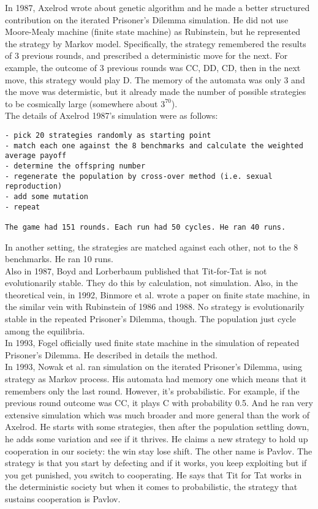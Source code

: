 \documentclass[12.5pt]{report}
\begin{document}
In 1987, Axelrod wrote about genetic algorithm \cite{axel4} and he made a better structured contribution on the iterated Prisoner's Dilemma simulation. He did not use Moore-Mealy machine (finite state machine) as Rubinstein, but he represented the strategy by Markov model. Specifically, the strategy remembered the results of 3 previous rounds, and prescribed a deterministic move for the next. For example, the outcome of 3 previous rounds was CC, DD, CD, then in the next move, this strategy would play D. The memory of the automata was only 3 and the move was determistic, but it already made the number of possible strategies to be cosmically large (somewhere about $3^{70}$).\\

The details of Axelrod 1987's simulation were as follows: 
\begin{verbatim}
- pick 20 strategies randomly as starting point
- match each one against the 8 benchmarks and calculate the weighted average payoff
- determine the offspring number
- regenerate the population by cross-over method (i.e. sexual reproduction)
- add some mutation
- repeat

The game had 151 rounds. Each run had 50 cycles. He ran 40 runs.
\end{verbatim}
In another setting, the strategies are matched against each other, not to the 8 benchmarks. He ran 10 runs.\\

Also in 1987, Boyd and Lorberbaum \cite{boyd,lorb} published that Tit-for-Tat is not evolutionarily stable. They do this by calculation, not simulation. Also, in the theoretical vein, in 1992, Binmore et al. wrote a paper on finite state machine, in the similar vein with Rubinstein of 1986 and 1988. No strategy is evolutionarily stable in the repeated Prisoner's Dilemma, though. The population just cycle among the equilibria.\\

In 1993, Fogel officially used finite state machine in the simulation of repeated Prisoner's Dilemma. He described in details the method.\\

In 1993, Nowak et al. ran simulation on the iterated Prisoner's Dilemma, using strategy as Markov process. His automata had memory one which means that it remembers only the last round. However, it's probabilistic. For example, if the previous round outcome was CC, it plays C with probability 0.5. And he ran very extensive simulation which was much broader and more general than the work of Axelrod. He starts with some strategies, then after the population settling down, he adds some variation and see if it thrives. He claims a new strategy to hold up cooperation in our society: the win stay lose shift. The other name is Pavlov. The strategy is that you start by defecting and if it works, you keep exploiting but if you get punished, you switch to cooperating. He says that Tit for Tat works in the deterministic society but when it comes to probabilistic, the strategy that sustains cooperation is Pavlov.\\
\end{document}

